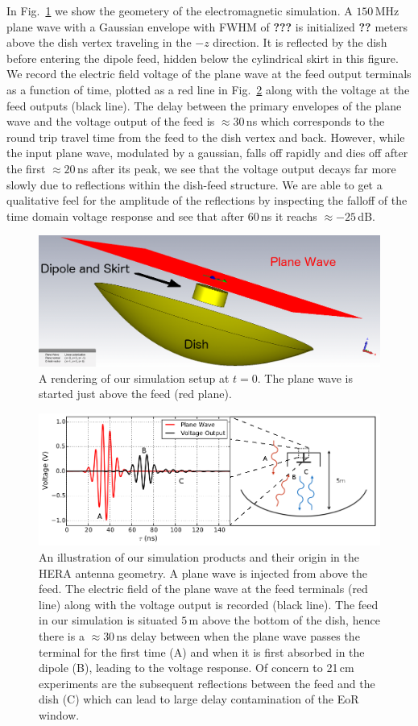 \documentclass[twocolumn]{emulateapj}
\begin{document}
In Fig.~\ref{fig:SimulationSetup} we show the geometery of the electromagnetic simulation. A $150$\,MHz plane wave with a Gaussian envelope with FWHM of {\bf \color{red}???} is initialized {\bf \color{red} ??} meters above the dish vertex traveling in the $-z$ direction. It is reflected by the dish before entering the dipole feed, hidden below the cylindrical skirt in this figure. We record the electric field voltage of the plane wave at the feed output terminals as a function of time, plotted as a red line in Fig.~\ref{fig:SimulationOutput} along with the voltage at the feed outputs (black line). The delay between the primary envelopes of the plane wave and the voltage output of the feed is $\approx 30$\,ns which corresponds to the round trip travel time from the feed to the dish vertex and back. However, while the input plane wave, modulated by a gaussian, falls off rapidly and dies off after the first $\approx 20$\,ns after its peak, we see that the voltage output decays far more slowly due to reflections within the dish-feed structure. We are able to get a qualitative feel for the amplitude of the reflections by inspecting the falloff of the time domain voltage response and see that after $60$\,ns it reachs $\approx -25$\,dB.
\begin{figure}
\includegraphics[width=.5\textwidth]{figures/One_dish_Pfeed_render_pw_0deg.png}
\caption{A rendering of our simulation setup at $t=0$. The plane wave is started just above the feed (red plane).}\label{fig:SimulationSetup}
\end{figure}

\begin{figure}
\includegraphics[width=\textwidth]{figures/SimulationIllustration.png}
\caption{An illustration of our simulation products and their origin in the HERA antenna geometry. A plane wave is injected from above the feed. The electric field of the plane wave at the feed terminals (red line) along with the voltage output is recorded (black line). The feed in our simulation is situated $5$\,m above the bottom of the dish, hence there is a $\approx 30$\,ns delay between when the plane wave passes the terminal for the first time (A) and when it is first absorbed in the dipole (B), leading to the voltage response. Of concern to 21\,cm experiments are the subsequent reflections between the feed and the dish (C) which can lead to large delay contamination of the EoR window.}
\label{fig:SimulationOutput}
\end{figure}
\end{document}
